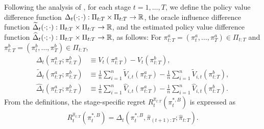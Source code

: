 Following the analysis of \cite{zhou2022offline}, for each stage $t=1,\ldots,T$, we define the policy value difference function $\Delta_{t}(\cdot;\cdot):\Pi_{t:T} \times \Pi_{t:T} \rightarrow \mathbb{R}$, the oracle influence difference function $\widetilde{\Delta}_{t}(\cdot;\cdot):\Pi_{t:T} \times \Pi_{t:T} \rightarrow \mathbb{R}$, and the estimated policy value difference function $\widehat{\Delta}_{t}(\cdot;\cdot):\Pi_{t:T} \times \Pi_{t:T} \rightarrow \mathbb{R}$, as follows: For $\pi_{t:T}^{a}=(\pi_{t}^{a},\ldots,\pi_{T}^{a}) \in \Pi_{t:T}$ and $\pi_{t:T}^{b}=(\pi_{t}^{b},\ldots,\pi_{T}^{b}) \in \Pi_{t:T}$,
\begin{align}
\Delta_{t}(\pi_{t:T}^{a};\pi_{t:T}^{b})&\equiv V_{t}(\pi_{t:T}^{a}) - V_{t}(\pi_{t:T}^{b}), \label{eq:Delta} \\
 \widetilde{\Delta}_{t}(\pi_{t:T}^{a};\pi_{t:T}^{b}) &\equiv \frac{1}{n}\sum_{i=1}^{n} \widetilde{V}_{i,t}\left(\pi_{t:T}^{a}\right) - \frac{1}{n}\sum_{i=1}^{n} \widetilde{V}_{i,t}\left(\pi_{t:T}^{b}\right), \label{eq:Delta_tilde}\\
 \widehat{\Delta}_{t}(\pi_{t:T}^{a};\pi_{t:T}^{b}) &\equiv  \frac{1}{n}\sum_{i=1}^{n} \widehat{V}_{i,t}\left(\pi_{t:T}^{a}\right) -  \frac{1}{n}\sum_{i=1}^{n} \widehat{V}_{i,t}\left(\pi_{t:T}^{b}\right).\nonumber
\end{align}
From the definitions, the stage-specific regret $R_{t}^{\hat{\pi}_{t:T}}(\pi_{t}^{\ast,B})$ is expressed as
\begin{align*}
    R_{t}^{\hat{\pi}_{t:T}}(\pi_{t}^{\ast,B}) = \Delta_{t}\left(\pi_{t}^{\ast,B},\hat{\pi}_{(t+1):T};\hat{\pi}_{t:T}\right).
\end{align*}

